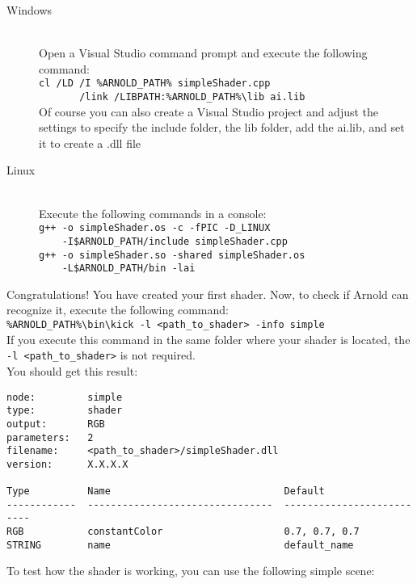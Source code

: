\begin{description}

\item[Windows] \hfill \\
Open a Visual Studio command prompt and execute the following command:\\
\verb|cl /LD /I %ARNOLD_PATH% simpleShader.cpp|\\
\verb|       /link /LIBPATH:%ARNOLD_PATH%\lib ai.lib|\\
Of course you can also create a Visual Studio project and adjust the settings to specify the include folder, the lib folder, add the ai.lib, and set it to create a .dll file

\item[Linux] \hfill \\
Execute the following commands in a console:\\
\verb|g++ -o simpleShader.os -c -fPIC -D_LINUX|\\
\verb|    -I$ARNOLD_PATH/include simpleShader.cpp|\\
\verb|g++ -o simpleShader.so -shared simpleShader.os|\\
\verb|    -L$ARNOLD_PATH/bin -lai|\\

\end{description}

Congratulations! You have created your first shader. Now, to check if Arnold can recognize it, execute the following command:\\
\verb|%ARNOLD_PATH%\bin\kick -l <path_to_shader> -info simple|\\
If you execute this command in the same folder where your shader is located, the \verb|-l <path_to_shader>| is not required.\\

You should get this result:
{\footnotesize \begin{verbatim}
node:         simple
type:         shader
output:       RGB
parameters:   2
filename:     <path_to_shader>/simpleShader.dll
version:      X.X.X.X

Type          Name                              Default
------------  --------------------------------  --------------------------
RGB           constantColor                     0.7, 0.7, 0.7
STRING        name                              default_name
\end{verbatim}}


To test how the shader is working, you can use the following simple scene:

